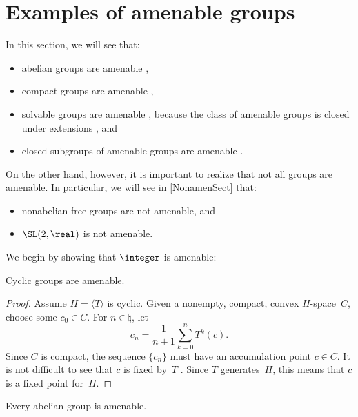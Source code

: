 \section{Examples of amenable groups}

In this section, we will see that:
\noprelistbreak
\begin{itemize}
\item abelian groups are amenable ,
\item compact groups are amenable ,
\item solvable groups are amenable , because the class of amenable groups is closed under extensions ,  
and
\item closed subgroups of amenable groups are amenable .
\end{itemize}
On the other hand, however, it is important to realize that not all groups are amenable. In particular, we will see in \cref{NonamenSect} that:
	\noprelistbreak
	\begin{itemize}
	\item nonabelian free groups are not amenable, 
	and
	\item $\SL(2,\real)$ is not amenable.
	\end{itemize}

\bigbreak

We begin by showing that $\integer$ is amenable:

\begin{prop} \label{CyclicAmen}
Cyclic groups are amenable.
\end{prop}

\begin{proof}
Assume $H = \langle T \rangle$ is cyclic. Given a nonempty, compact, convex $H$-space~$C$, choose some $c_0 \in C$.  For $n \in \natural$, let
	\begin{equation} \label{AmenInvt-c_n}
	c_n  =  \frac{1}{n+1}  \sum_{k = 0}^{n} T^k(c) 
	. \end{equation}
Since $C$ is compact, the sequence $\{c_n\}$ must have an accumulation point $c \in C$. It is not difficult to see that $c$ is fixed by~$T$ . Since $T$ generates~$H$, this means that $c$ is a fixed point for~$H$.
\end{proof}

\begin{cor} \label{AbelAmen}
Every abelian group is amenable.
\end{cor}

